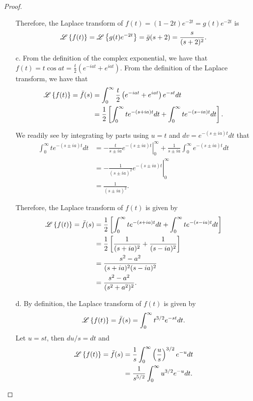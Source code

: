 \begin{proof}
\begin{enumerate}
      Therefore, the Laplace transform of $f(t) = (1-2t)e^{-2t} = g(t)e^{-2t}$
      is
      \begin{align*}
        \mathscr{L}\left\{ {f(t)} \right\} = \mathscr{L}\left\{ {g(t)e^{-2t}} \right\} = \bar{g}(s+2) = \frac{s}{(s+2)^2}.
      \end{align*}
    \item[c.] From the definition of the complex exponential,
      we have that $f(t) = t\cos at = \frac{t}{2}\left(e^{-iat} + e^{iat}\right)$.
      From the definition of the Laplace transform, we have that
      \begin{align*}
        \mathscr{L}\left\{ {f(t)} \right\} = \bar{f}(s) &= \int_0^\infty \frac{t}{2}\left(e^{-iat} + e^{iat}\right) e^{-st} dt \\
        &= \frac{1}{2}\left[\int_0^\infty t e^{-(s+ia)t} dt + \int_0^\infty t e^{-(s-ia)t}dt\right].
      \end{align*}

      We readily see by integrating by parts using $u=t$ and $dv = e^{-(s\pm ia)t}dt$ that
      \begin{align*}
        \int_0^\infty t e^{-(s\pm ia)t}dt
        &= \left.-\frac{t}{s\pm ia} e^{-(s\pm ia)t} \right\rvert_0^\infty + \frac{1}{s\pm ia}\int_0^\infty  e^{-(s\pm ia)t} dt \\
        &= \left.-\frac{1}{(s\pm ia)^2} e^{-(s\pm ia)t}\right\rvert_0^\infty \\
        &= \frac{1}{(s\pm ia)^2}.
      \end{align*}

      Therefore, the Laplace transform of $f(t)$ is given by
      \begin{align*}
        \mathscr{L}\left\{ {f(t)} \right\} = \bar{f}(s)         &= \frac{1}{2}\left[\int_0^\infty t e^{-(s+ia)t} dt + \int_0^\infty t e^{-(s-ia)t}dt\right] \\
        &= \frac{1}{2}\left[\frac{1}{(s+ ia)^2} + \frac{1}{(s-ia)^2}\right] \\
        &= \frac{s^2 - a^2}{(s+ia)^2(s-ia)^2} \\
        &= \frac{s^2 - a^2}{(s^2 + a^2)^2}.
      \end{align*}
    \item[d.] By definition,
      the Laplace transform of $f(t)$ is given by
      \begin{align*}
        \mathscr{L}\left\{ {f(t)} \right\} = \bar{f}(s) = \int_0^\infty t^{3/2}e^{-st}dt.
      \end{align*}
      Let $u=st$, then $du / s = dt$ and
      \begin{align*}
        \mathscr{L}\left\{ {f(t)} \right\} = \bar{f}(s)
        &= \frac{1}{s}\int_0^\infty \left(\frac{u}{s}\right)^{3/2}e^{-u}dt \\
        &= \frac{1}{s^{5/2}}\int_0^\infty u^{3/2}e^{-u}dt.
      \end{align*}


\end{enumerate}
\end{proof}
